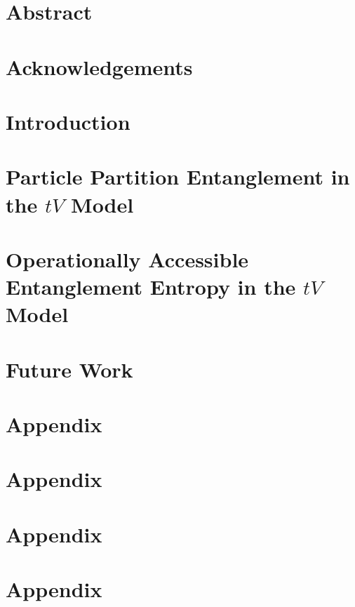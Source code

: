 \documentclass[12pt, two sided]{report}
\begin{document}



\chapter*{Abstract}


\chapter*{Acknowledgements}


\setcounter{page}{2}

\singlespacing
\tableofcontents
\doublespacing

\chapter{Introduction}



\chapter{Particle Partition Entanglement in the $tV$ Model}


\chapter{Operationally Accessible Entanglement Entropy in the $tV$ Model}


\chapter{Future Work}


\appendix
\chapter{Appendix}


\chapter{Appendix}


\chapter{Appendix}


\chapter{Appendix}


{} 

\end{document}
